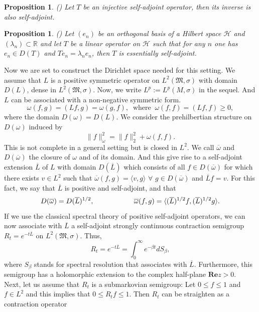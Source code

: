 \documentclass[10pt]{article}
\newtheorem{prop}[thm]{Proposition}
\theoremstyle{definition}
\numberwithin{equation}{section}
\begin{document}
\begin{prop}(\cite{Yoshida})
\normalfont
Let $T$ be an injective self-adjoint operator, then its inverse is also self-adjoint.
\end{prop}
\begin{prop}(\cite{Yoshida})
\normalfont
Let $(e_n)$ be an orthogonal basis of a Hilbert space $\mathcal{H}$ and$(\lambda_n)\subset\mathbb{R}$ and let $T$ be a linear operator on $\mathcal{H}$ such that for any $n$ one has $e_n\in D(T)$ and $Te_n=\lambda_n e_n$, then $T$ is essentially self-adjoint.
	\end{prop}
	\noindent
Now we are set to construct the Dirichlet space needed for this setting. We assume that $L$ is a positive symmetric operator on $L^2 (\mathfrak{M},\sigma)$ with domain $D(L)$, dense in $ L^2 (\mathfrak{M},\sigma)$.
	Now, we write $ L^p := L^p (M,\sigma)$ in the sequel. And $L$ can be associated with a non-negative  symmetric form.
	$$ \omega (f,g) = 	(Lf,g)	= \omega (g,f),\;\; \mbox{where}\;\; \omega(f,f) = 	(Lf,f)	\geq 0,$$
	where the domain $ D(\omega) = D(L)$. We consider the prehilbertian structure on $D(\omega)$ induced by
	$$ \lVert f \rVert_{\omega} ^2 = \lVert f \rVert_{2} ^2 + \omega(f,f).$$ This is not complete in a general setting but is closed in $L^2$. We call  $\overline{\omega}$ and $D(\overline{\omega})$ the closure of ${\omega}$ and of its domain. And this give rise to a self-adjoint extension $\overline{L}$ of $L$ with domain $D(\overline{L})$ which consists of all $f \in D(\overline{\omega})$ for which there exists $v \in L^2$ such that $ \overline{\omega}(f,g) =	\langle v, g \rangle$
	$\forall$ $ g \in D(\overline{\omega})$ and $ \overline{L}f = v$.
	For this fact, we say that $\overline{L}$ is positive and self-adjoint, and that
	$$ D(\overline{\omega}) = D(\overline{L})^{1/2}, \hspace{2 cm} \overline{\omega}(f,g) = \langle (\overline{L})^{1/2} f, (\overline{L})^{1/2} g \rangle.$$
	If we use the classical spectral theory of positive self-adjoint operators, we can now associate with $ \overline{L}$ a self-adjoint strongly continuous contraction semigroup $ R_t = e^{-t\overline{L}} $ on $ L^2 (\mathfrak{M},\sigma)$. Thus,
	$$ R_t=e^{-t\overline{L}} = \int_{0}^{\infty} e^{-\beta t} d S_{\beta},$$
	where $S_{\beta}$ stands for spectral resolution that associates with $\overline{L}$. Furthermore, this semigroup has
	a holomorphic extension to the complex half-plane $ \textbf{Re} z > 0$.\\
Next, let us assume that $ R_t$  is a submarkovian semigroup: Let $ 0 \leq f \leq 1 $ and $ f \in L^2 $ and this implies that  $ 0 \leq R_t f \leq 1 $. Then $R_t$ can be straighten as a contraction operator
\end{document}
